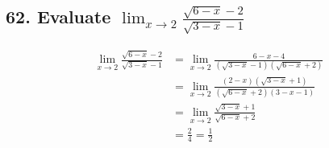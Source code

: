 \documentclass{article}
\begin{document}
    \subsection*{62. Evaluate $\lim_{x \to 2}\frac{\sqrt{6 -x } - 2}{\sqrt{3 - x} - 1}$}
    $$
    \begin{aligned}
        \lim_{x \to 2}{\frac{\sqrt{6 -x} - 2}{\sqrt{3 - x} - 1}} &= \lim_{x \to 2}\frac{6 - x - 4}{(\sqrt{3 - x} - 1)(\sqrt{6 - x} + 2)} \\
        &= \lim_{x \to 2}\frac{(2 - x)(\sqrt{3 - x} + 1)}{(\sqrt{6 - x} + 2)(3 - x - 1)} \\
        &= \lim_{x \to 2}\frac{\sqrt{3 - x} + 1}{\sqrt{6 - x} + 2} \\
        &= \frac{2}{4} = \frac{1}{2}
    \end{aligned}
    $$
\end{document}
